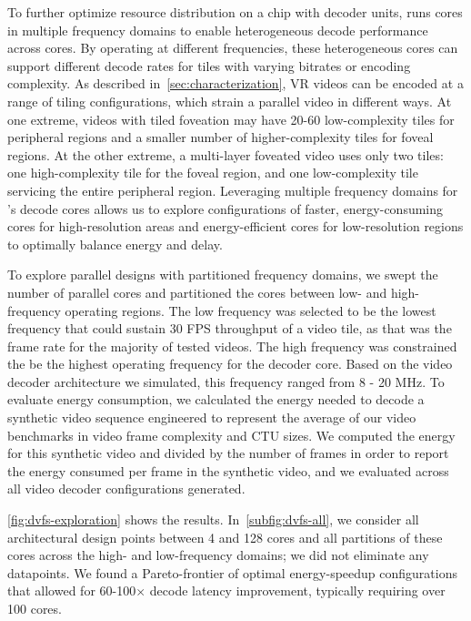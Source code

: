 To further optimize resource distribution on a chip with decoder units, \nameArch runs cores in multiple frequency domains to enable heterogeneous decode performance across cores.
By operating at different frequencies, these heterogeneous cores can support different decode rates for tiles with varying bitrates or encoding complexity.
As described in~\ref{sec:characterization}, VR videos can be encoded at a range of tiling configurations, which strain a parallel video in different ways.
At one extreme, videos with tiled foveation may have 20-60 low-complexity tiles for peripheral regions and a smaller number of higher-complexity tiles for foveal regions.
At the other extreme, a multi-layer foveated video uses only two tiles: one high-complexity tile for the foveal region, and one low-complexity tile servicing the entire peripheral region.
Leveraging multiple frequency domains for \nameArch's decode cores allows us to explore configurations of faster, energy-consuming cores for high-resolution areas and energy-efficient cores for low-resolution regions to optimally balance energy and delay.

To explore parallel designs with partitioned frequency domains, we swept the number of parallel cores and partitioned the cores between low- and high-frequency operating regions.
The low frequency was selected to be the lowest frequency that could sustain 30 FPS throughput of a video tile, as that was the frame rate for the majority of tested videos. The high frequency was constrained the be the highest operating frequency for the decoder core.
Based on the video decoder architecture we simulated, this frequency ranged from 8 - 20 MHz.
To evaluate energy consumption, we calculated the energy needed to decode a synthetic video sequence engineered to represent the average of our video benchmarks in video frame complexity and CTU sizes.
We computed the energy for this synthetic video and divided by the number of frames in order to report the energy consumed per frame in the synthetic video, and we evaluated across all video decoder configurations generated.

\ref{fig:dvfs-exploration} shows the results. In~\ref{subfig:dvfs-all}, we consider all architectural design points between 4 and 128 cores and all partitions of these cores across the high- and low-frequency domains; we did not eliminate any datapoints.
We found a Pareto-frontier of optimal energy-speedup configurations that allowed for 60-100$\times$ decode latency improvement, typically requiring over 100 cores.

